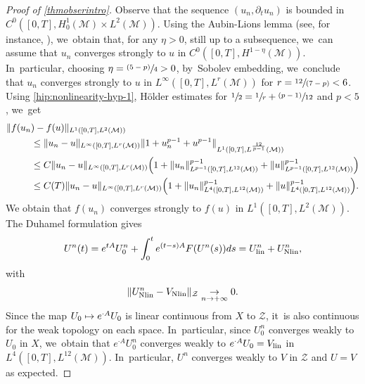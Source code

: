 \documentclass[JEP,XML,SOM,Unicode,published]{cedram}
\newcommand{\psfrac}[2]{\sfrac{(#1)}{#2}}
\newcommand{\spfrac}[2]{\sfrac{#1}{(#2)}}
\newcommand\mto{\mathchoice{\longmapsto}{\mapsto}{\mapsto}{\mapsto}}
\newcommand{\lin}{\textup{lin}}
\newcommand{\Nlin}{\textup{Nlin}}
\theoremstyle{definition}
\let\mc\mathcal
\newcommand{\M}{\mc{M}}
\providecommand{\norm}[1]{\lVert#1\rVert}
\begin{document}
\begin{proof}[Proof of \cref{thmobserintro}]
Observe that the sequence $(u_{n}, \partial_{t }u_{n})$ is bounded in $C^{0}([0, T],H_0^1(\M)\times L^2(\M))$. Using the Aubin-Lions lemma (see, for instance, \cite[Cor.\,4]{S:87}), we~obtain that, for any $\eta>0$, still up to a subsequence, we~can assume that $u_{n}$ converges strongly to $u$ in $C^{0}([0, T],H^{1-\eta}(\M))$. In~particular, choosing $\eta=\psfrac{5-p}{4}>0$, by~Sobolev embedding, we~conclude that $u_{n}$ converges strongly to $u$ in $L^{\infty}([0, T],L^{r}(\M))$ for $r=\spfrac{12}{7-p}<6$. Using \eqref{hip:nonlinearity-hyp-1}, Hölder estimates for $\sfrac{1}{2}=\sfrac{1}{r}+\psfrac{p-1}{12} $ and $p<5$, we~get
\begin{align*}
\|f(u_{n}&)-f(u)\|_{L^{1}([0, T], L^{2}(\M))}\\
&\leq \norm{u_{n}-u}_{L^{\infty}([0, T], L^{r}(\M))}\norm{1+ u_{n}^{p-1}+u^{p-1}}_{L^{1}([0, T],L^{\frac{12}{p-1}}(\M))}\\
&\leq C \norm{u_{n}-u}_{L^{\infty}([0,T], L^{r}(\M))}\Bigl(1+\norm{u_{n}}_{L^{p-1}([0, T],L^{12}(\M))}^{p-1}+\norm{u}_{L^{p-1}([0, T],L^{12}(\M))}^{p-1}\Bigr)\\
&\leq C(T) \norm{u_{n}-u}_{L^{\infty}([0,T], L^{r}(\M))}\Bigl(1+\norm{u_{n}}_{L^{4}([0, T],L^{12}(\M))}^{p-1}+\norm{u}_{L^{4}([0, T],L^{12}(\M))}^{p-1}\Bigr).
\end{align*}
We obtain that $f(u_{n})$ converges strongly to $f(u)$ in $L^{1}([0, T], L^{2}(\M))$. The Duhamel formulation gives
\begin{align*}
U^n(t)=e^{tA}U_0^n+\int_0^t e^{(t-s)A}F(U^n(s))ds=U_{\lin}^n+U_{\Nlin}^n,
\end{align*}
with
\begin{align}
\label{e:cvgNL}
\norm{U_{\Nlin}^n-V_{\Nlin}}_{\mc{Z}}\underset{n\to +\infty}{\to}0.
\end{align}
Since the map $U_0 \mto e^{\cdot A}U_0$ is linear continuous from $X$ to $\mc{Z}$, it~is also continuous for the weak topology on each space. In~particular, since $U_0^n$ converges weakly to $U_0$ in $X$, we~obtain that $e^{\cdot A}U_0^n$ converges weakly to $e^{\cdot A}U_0=V_{\lin}$ in $L^{4}([0, T],L^{12}(\M))$. In~particular, $U^n$ converges weakly to $V$ in $\mc{Z}$ and $U=V$ as expected.


\end{proof}
\end{document}

